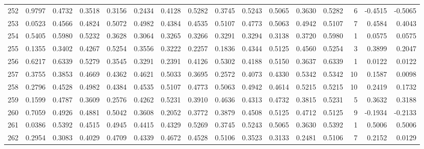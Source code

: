 \begin{tabular}{lrrrrrrrrrrrrrrr}
252 &      0.9797 &  0.4732 &  0.3518 &  0.3156 &  0.2434 &  0.4128 &  0.5282 &  0.3745 &  0.5243 &  0.5065 &   0.3630 &     0.5282 &      6 &                   -0.4515 &                    -0.5065 \\
253 &      0.0523 &  0.4566 &  0.4824 &  0.5072 &  0.4982 &  0.4384 &  0.4535 &  0.5107 &  0.4773 &  0.5063 &   0.4942 &     0.5107 &      7 &                    0.4584 &                     0.4043 \\
254 &      0.5405 &  0.5980 &  0.5232 &  0.3628 &  0.3064 &  0.3265 &  0.3266 &  0.3291 &  0.3294 &  0.3138 &   0.3720 &     0.5980 &      1 &                    0.0575 &                     0.0575 \\
255 &      0.1355 &  0.3402 &  0.4267 &  0.5254 &  0.3556 &  0.3222 &  0.2257 &  0.1836 &  0.4344 &  0.5125 &   0.4560 &     0.5254 &      3 &                    0.3899 &                     0.2047 \\
256 &      0.6217 &  0.6339 &  0.5279 &  0.3545 &  0.3291 &  0.2391 &  0.4126 &  0.5302 &  0.4188 &  0.5150 &   0.3637 &     0.6339 &      1 &                    0.0122 &                     0.0122 \\
257 &      0.3755 &  0.3853 &  0.4669 &  0.4362 &  0.4621 &  0.5033 &  0.3695 &  0.2572 &  0.4073 &  0.4330 &   0.5342 &     0.5342 &     10 &                    0.1587 &                     0.0098 \\
258 &      0.2796 &  0.4528 &  0.4982 &  0.4384 &  0.4535 &  0.5107 &  0.4773 &  0.5063 &  0.4942 &  0.4614 &   0.5215 &     0.5215 &     10 &                    0.2419 &                     0.1732 \\
259 &      0.1599 &  0.4787 &  0.3609 &  0.2576 &  0.4262 &  0.5231 &  0.3910 &  0.4636 &  0.4313 &  0.4732 &   0.3815 &     0.5231 &      5 &                    0.3632 &                     0.3188 \\
260 &      0.7059 &  0.4926 &  0.4881 &  0.5042 &  0.3608 &  0.2052 &  0.3772 &  0.3879 &  0.4508 &  0.5125 &   0.4712 &     0.5125 &      9 &                   -0.1934 &                    -0.2133 \\
261 &      0.0386 &  0.5392 &  0.4515 &  0.4945 &  0.4415 &  0.4329 &  0.5269 &  0.3745 &  0.5243 &  0.5065 &   0.3630 &     0.5392 &      1 &                    0.5006 &                     0.5006 \\
262 &      0.2954 &  0.3083 &  0.4029 &  0.4709 &  0.4339 &  0.4672 &  0.4528 &  0.5106 &  0.3523 &  0.3133 &   0.2481 &     0.5106 &      7 &                    0.2152 &                     0.0129 \\

\end{tabular}
